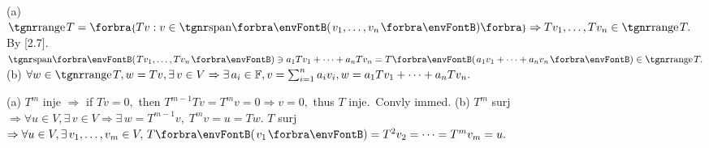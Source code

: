  {
}(a) $\range T=\Bra{Tv:v\in\Span{v_1,\dots,v_n}}\Rightarrow Tv_1,\dots,Tv_n\in\range T.$ By [2.7].\parSol{\Ha}
\Or $\Span{Tv_1,\dots,Tv_n}\ni a_1 Tv_1+\dots+a_n Tv_n=T\Par{a_1 v_1+\dots+a_n v_n}\in\range T.$\parSol{}
(b) $\forall w\in\range T,w=Tv,\exists\,v\in V\Rightarrow\exists\,a_i\in\Fbb,v=\sum_{i=1}^na_i v_i,w=a_1 Tv_1+\dots+a_n Tv_n.$\PfEnd
\SepLine


(a) $T^m$ inje $\Rightarrow$ if $Tv=0,$ then $T^{m-1} Tv=T^m v=0\Rightarrow v=0,$ thus $T$ inje. \,Convly immed.\vspace{2pt}\parSol{}
(b) $T^m$ surj $\Rightarrow\forall u\in V,\exists\,v\in V\Rightarrow\exists\,w=T^{m-1}v,\;T^m v=u=Tw.$\parSol{\Hb}
$T$ surj $\Rightarrow\forall u\in V,\exists\,v_1,\dots,v_m\in V,\,T\Par{v_1}=T^2v_2=\cdots=T^m v_m=u.$\PfEnd
\SepLine

